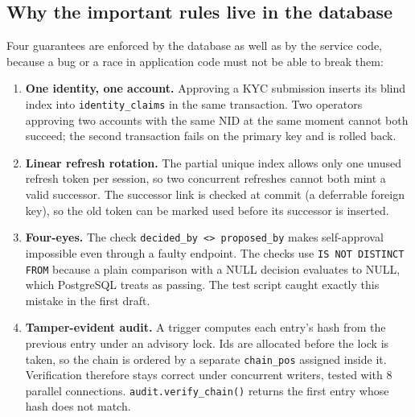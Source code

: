 \documentclass[11pt,a4paper]{article}
\begin{document}
\subsection{Why the important rules live in the database}
Four guarantees are enforced by the database as well as by the service code, because a bug or a race in application code must not be able to break them:
\begin{enumerate}[nosep]
  \item \textbf{One identity, one account.} Approving a KYC submission inserts its blind index into \texttt{identity\_claims} in the same transaction. Two operators approving two accounts with the same NID at the same moment cannot both succeed; the second transaction fails on the primary key and is rolled back.
  \item \textbf{Linear refresh rotation.} The partial unique index allows only one unused refresh token per session, so two concurrent refreshes cannot both mint a valid successor. The successor link is checked at commit (a deferrable foreign key), so the old token can be marked used before its successor is inserted.
  \item \textbf{Four-eyes.} The check \texttt{decided\_by <> proposed\_by} makes self-approval impossible even through a faulty endpoint. The checks use \texttt{IS NOT DISTINCT FROM} because a plain comparison with a NULL decision evaluates to NULL, which PostgreSQL treats as passing. The test script caught exactly this mistake in the first draft.
  \item \textbf{Tamper-evident audit.} A trigger computes each entry's hash from the previous entry under an advisory lock. Ids are allocated before the lock is taken, so the chain is ordered by a separate \texttt{chain\_pos} assigned inside it. Verification therefore stays correct under concurrent writers, tested with 8 parallel connections. \texttt{audit.verify\_chain()} returns the first entry whose hash does not match.
\end{enumerate}
\end{document}
